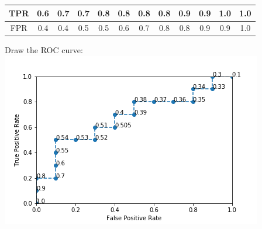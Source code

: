 \documentclass{article}
\begin{document}
\begin{center}
    \begin{tabular}{| c | c | c | c | c | c | c | c | c | c | c | c |} 
    \hline
    TPR &0.6 &0.7 &0.7 &0.8 &0.8 &0.8 &0.8 &0.9 &0.9 &1.0 &1.0 \\ 
    \hline
    FPR &0.4 &0.4 &0.5 &0.5 &0.6 &0.7 &0.8 &0.8 &0.9 &0.9 &1.0 \\ 
    \hline
    \end{tabular}
\end{center}

\noindent Draw the ROC curve: \\
\includegraphics{ROC.png}
\end{document}
